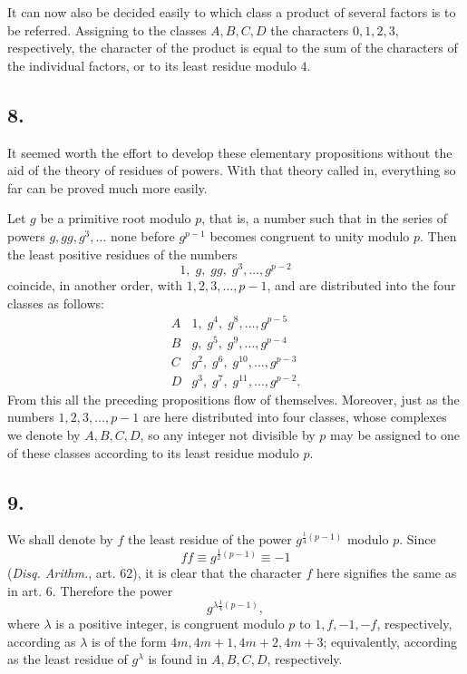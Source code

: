 \documentclass[12pt]{article}
\begin{document}
It can now also be decided easily to which class a product of several factors is to be referred. Assigning to the classes $A,B,C,D$ the characters $0,1,2,3$, respectively, the character of the product is equal to the sum of the characters of the individual factors, or to its least residue modulo $4$.

\subsection*{8.}

It seemed worth the effort to develop these elementary propositions without the aid of the theory of residues of powers. With that theory called in, everything so far can be proved much more easily.

Let $g$ be a primitive root modulo $p$, that is, a number such that in the series of powers $g,gg,g^3,\ldots$ none before $g^{p-1}$ becomes congruent to unity modulo $p$. Then the least positive residues of the numbers
\[
1,\;g,\;gg,\;g^3,\ldots,g^{p-2}
\]
coincide, in another order, with $1,2,3,\ldots,p-1$, and are distributed into the four classes as follows:
\[
\begin{array}{c|l}
A&1,\;g^4,\;g^8,\ldots,g^{p-5}\\
B&g,\;g^5,\;g^9,\ldots,g^{p-4}\\
C&g^2,\;g^6,\;g^{10},\ldots,g^{p-3}\\
D&g^3,\;g^7,\;g^{11},\ldots,g^{p-2}.
\end{array}
\]
From this all the preceding propositions flow of themselves. Moreover, just as the numbers $1,2,3,\ldots,p-1$ are here distributed into four classes, whose complexes we denote by $A,B,C,D$, so any integer not divisible by $p$ may be assigned to one of these classes according to its least residue modulo $p$.

\subsection*{9.}

We shall denote by $f$ the least residue of the power $g^{\frac14(p-1)}$ modulo $p$. Since
\[
ff\equiv g^{\frac12(p-1)}\equiv -1
\]
(\emph{Disq. Arithm.}, art. 62), it is clear that the character $f$ here signifies the same as in art. 6. Therefore the power
\[
g^{\lambda\frac14(p-1)},
\]
where $\lambda$ is a positive integer, is congruent modulo $p$ to $1,f,-1,-f$, respectively, according as $\lambda$ is of the form $4m,4m+1,4m+2,4m+3$; equivalently, according as the least residue of $g^\lambda$ is found in $A,B,C,D$, respectively.
\end{document}
